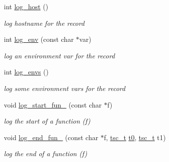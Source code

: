 \begin{DoxyCompactItemize}
\mbox{\label{structlogger_adbbd2917da3496e2e6e04cf17e115133}} 
int \hyperlink{structlogger_adbbd2917da3496e2e6e04cf17e115133}{log\+\_\+host} ()
\begin{DoxyCompactList}\small\item\em log hostname for the record \end{DoxyCompactList}\item 
\mbox{\label{structlogger_a834bbdabbff2c05c342bf3641d6c3966}} 
int \hyperlink{structlogger_a834bbdabbff2c05c342bf3641d6c3966}{log\+\_\+env} (const char $\ast$var)
\begin{DoxyCompactList}\small\item\em log an environment var for the record \end{DoxyCompactList}\item 
\mbox{\label{structlogger_a4de3a6b8949b4155ca57386fd83e1692}} 
int \hyperlink{structlogger_a4de3a6b8949b4155ca57386fd83e1692}{log\+\_\+envs} ()
\begin{DoxyCompactList}\small\item\em log some environment vars for the record \end{DoxyCompactList}\item 
\mbox{\label{structlogger_a88e0dc6e649e35549010eaad9ee713b4}} 
void \hyperlink{structlogger_a88e0dc6e649e35549010eaad9ee713b4}{log\+\_\+start\+\_\+fun\+\_\+} (const char $\ast$f)
\begin{DoxyCompactList}\small\item\em log the start of a function (f) \end{DoxyCompactList}\item 
\mbox{\label{structlogger_a91bda1816b1ceabe5c54184239932b8f}} 
void \hyperlink{structlogger_a91bda1816b1ceabe5c54184239932b8f}{log\+\_\+end\+\_\+fun\+\_\+} (const char $\ast$f, \hyperlink{structtsc__t}{tsc\+\_\+t} \hyperlink{structlogger_a6336fd3fffff10df04811a819c1c5a70}{t0}, \hyperlink{structtsc__t}{tsc\+\_\+t} t1)
\begin{DoxyCompactList}\small\item\em log the end of a function (f) \end{DoxyCompactList}\end{DoxyCompactItemize}
